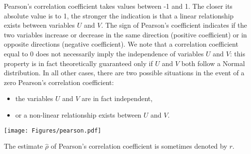 {  Pearson's correlation coefficient takes values between -1 and 1. The closer its absolute value is to 1, the stronger the indication is that a linear relationship exists between variables $U$ and $V$.
  The sign of Pearson's coefficient indicates if the two variables increase or decrease in the same direction (positive coefficient) or in opposite directions (negative coefficient). We note that a correlation coefficient equal to 0 does not necessarily imply the independence of variables $U$ and $V$: this property is in fact theoretically guaranteed only if $U$ and $V$ both follow a Normal distribution. In all other cases, there are two possible situations in the event of a zero Pearson's correlation coefficient:
  \begin{itemize}
  \item the variables $U$ and $V$ are in fact independent,
  \item or a non-linear relationship exists between $U$ and $V$.
  \end{itemize}

  \begin{center}
    \texttt{[image: Figures/pearson.pdf]}
  \end{center}
}
{
  The estimate $\widehat{\rho}$ of Pearson's correlation coefficient is sometimes denoted by $r$.
}


